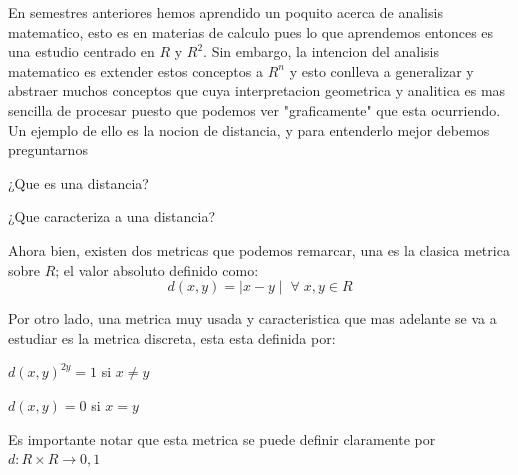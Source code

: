 \documentclass{report}
\begin{document}
  En semestres anteriores hemos aprendido un poquito acerca de analisis matematico, esto es en materias de calculo
  pues lo que aprendemos entonces es una estudio centrado en $R$ y $R^2$. Sin embargo, la intencion del analisis matematico
  es extender estos conceptos a $R^n$ y esto conlleva a generalizar y abstraer muchos conceptos que cuya interpretacion
  geometrica y analitica es mas sencilla de procesar puesto que podemos ver "graficamente" que esta ocurriendo. Un ejemplo de ello
  es la nocion de distancia, y para entenderlo mejor debemos preguntarnos
  
  ¿Que es una distancia?
  
  ¿Que caracteriza a una distancia?

  Ahora bien, existen dos metricas que podemos remarcar, una es la clasica metrica sobre $R$; el valor absoluto definido como:
  $$d(x,y) = \mid x-y \mid \; \forall \; x,y \in R$$

  Por otro lado, una metrica muy usada y caracteristica que mas adelante se va a estudiar es la metrica discreta, esta esta definida por: 
  
  $d(x,y)^{2y} = 1$ si $x \neq y$ 
  
  $d(x,y) = 0$ si $x = y$ 
  

  Es importante notar que esta metrica se puede definir claramente por $d: R \times R \to {0,1}$
\end{document}
